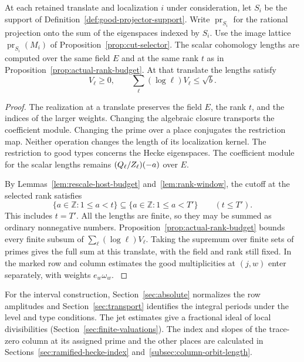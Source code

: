 \begin{lemma}\label{lem:strict-budget-after-cut}
At each retained translate and localization \(i\) under consideration,
let \(S_i\) be the support of Definition~\ref{def:good-projector-support}.
Write \(\operatorname{pr}_{S_i}\) for the rational projection onto the sum of
the eigenspaces indexed by \(S_i\). Use the image lattice
\(\operatorname{pr}_{S_i}(M_i)\) of Proposition~\ref{prop:cut-selector}.
The scalar cohomology
lengths are computed over the same field \(E\) and at the same rank \(t\)
as in Proposition~\ref{prop:actual-rank-budget}.
At that translate the lengths satisfy
\[
 V_\ell\ge0,\qquad \sum_\ell(\log\ell)V_\ell\le\sqrt b.
\]
\end{lemma}
\begin{proof}
The realization at a translate preserves the field \(E\), the
rank \(t\), and the indices of the larger weights.
Changing the algebraic closure transports the coefficient module.
Changing the prime over a place conjugates the restriction map.
Neither operation changes the length of its localization kernel.
The restriction to good types concerns the Hecke eigenspaces.
The coefficient module for the scalar lengths remains
\((Q_\ell/Z_\ell)(-a)\) over \(E\).

By Lemmas~\ref{lem:rescale-host-budget} and~\ref{lem:rank-window},
the cutoff at the selected rank satisfies
\[
 \{a\in\mathbb Z:1\le a<t\}\subseteq\{a\in\mathbb Z:1\le a<T'\}
                   \qquad(t\le T').
\]
This includes \(t=T'\).
All the lengths are finite, so they may be summed as ordinary
nonnegative numbers. Proposition~\ref{prop:actual-rank-budget}
bounds every finite subsum of \(\sum_\ell(\log\ell)V_\ell\).
Taking the supremum over finite sets of primes gives the full sum at this translate, with the field and rank still fixed.
In the marked row and column estimates the good multiplicities at
\((j,w)\) enter separately, with weights \(e_w\omega_w\).
\label{cor:family-window-3}
\end{proof}













For the interval construction, Section~\ref{sec:absolute} normalizes the row amplitudes and Section~\ref{sec:transport} identifies the integral periods under the level and type conditions. The jet estimates give a fractional ideal of local divisibilities (Section~\ref{sec:finite-valuations}). The index and slopes of the trace-zero column at its assigned prime and the other places are calculated in Sections~\ref{sec:ramified-hecke-index} and~\ref{subsec:column-orbit-length}.

